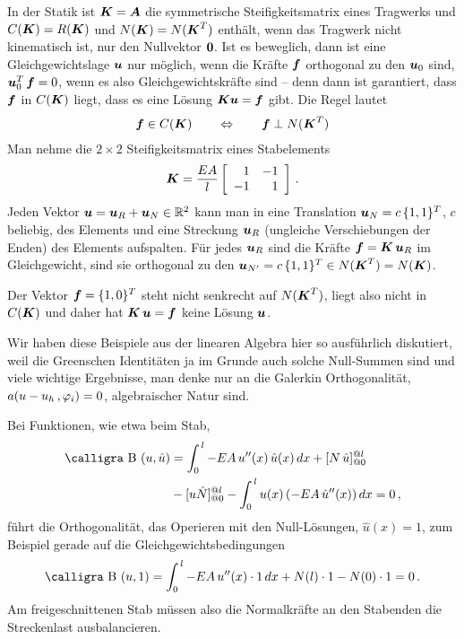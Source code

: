 In der Statik ist $\vek K = \vek A$ die symmetrische Steifigkeitsmatrix eines Tragwerks und $C(\vek K) = R(\vek K)$ und $N(\vek K) = N(\vek K^T)$ enth\"{a}lt, wenn das Tragwerk nicht kinematisch ist, nur den Nullvektor $\vek 0$. Ist es beweglich, dann ist eine Gleichgewichtslage $\vek u$ nur m\"{o}glich, wenn die Kr\"{a}fte $\vek f$ orthogonal zu den $\vek u_0$ sind, $\vek u_0^T\,\vek f = 0$, wenn es also Gleichgewichtskr\"{a}fte sind -- denn dann ist garantiert, dass $\vek f$ in $C(\vek K)$ liegt, dass es eine L\"{o}sung $\vek K\vek u = \vek f$ gibt. Die Regel lautet
\begin{align}
\vek f \in C(\vek K) \qquad \Leftrightarrow \qquad \vek f \perp N(\vek K^T)
\end{align}
Man nehme die $2 \times 2$ Steifigkeitsmatrix eines Stabelements
\begin{align}
\vek K = \frac{EA}{l}\left [ \barr{r r} 1 & -1 \\ -1 & 1 \earr \right ]\,.
\end{align}
Jeden Vektor $\vek u = \vek u_R + \vek u_N \in \mathbb{R}^2$ kann man in eine Translation $\vek u_N = c\,\{1, 1\}^T$, $c$ beliebig, des Elements und eine Streckung $\vek u_R$ (ungleiche Verschiebungen der Enden) des Elements aufspalten. F\"{u}r jedes $\vek u_R$ sind die Kr\"{a}fte $\vek f = \vek K\,\vek u_R$ im Gleichgewicht, sind sie orthogonal zu den $\vek u_{N'} = c\,\{1 , 1\}^T \in N(\vek K^T) = N(\vek K)$.

Der Vektor $\vek f = \{1,0\}^T$ steht nicht senkrecht auf $N(\vek K^T)$, liegt also nicht in $C(\vek K)$ und daher hat $\vek K\,\vek u = \vek f$ keine L\"{o}sung $\vek u$.

Wir haben diese Beispiele aus der linearen Algebra hier so ausf\"{u}hrlich diskutiert, weil die Greenschen Identit\"{a}ten ja im Grunde auch solche Null-Summen sind und viele wichtige Ergebnisse, man denke nur an die Galerkin Orthogonalit\"{a}t, $a(u-u_h\,,\Np_i) = 0$, algebraischer Natur sind.

Bei Funktionen, wie etwa beim Stab,
\begin{align}
\text{\normalfont\calligra B\,\,}(u,\hat{u}) &= \int_0^{\,l} - EA\,u''(x)\,\hat{u}(x)\,dx + [N\,\hat{u}]_{@0}^{@l}\nn \\
&- [u \hat{N}]_{@0}^{@l} - \int_0^{\,l} u(x)\,(- EA\,\hat{u}''(x))\,dx = 0\,,
\end{align}
f\"{u}hrt die Orthogonalit\"{a}t, das Operieren mit den Null-L\"{o}sungen, $\hat{u}(x) = 1$, zum Beispiel gerade auf die Gleichgewichtsbedingungen
\begin{align}
\text{\normalfont\calligra B\,\,}(u,1) = \int_0^{\,l} - EA\,u''(x) \cdot 1\,dx + N(l) \cdot 1 - N(0) \cdot 1 = 0\,.
\end{align}
Am freigeschnittenen Stab m\"{u}ssen also die Normalkr\"{a}fte an den Stabenden die Streckenlast ausbalancieren.


